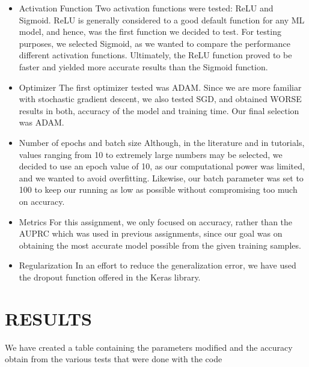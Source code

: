 \documentclass{article}
\begin{document}
\begin{itemize}

  \item{Activation Function} Two activation functions were tested: ReLU and Sigmoid. ReLU is generally considered to a good default function for any ML model, and hence, was the first function we decided to test. For testing purposes, we selected Sigmoid, as we wanted to compare the performance   different activation functions. Ultimately, the ReLU function proved to be faster and yielded more accurate results than the Sigmoid function.
  
   \item{  Optimizer}
   The first optimizer tested was ADAM. Since we are more familiar with stochastic gradient descent, we also tested SGD, and obtained  WORSE results in both, accuracy of the model and training time. Our final selection was ADAM.
   
     \item{ Number of epochs and batch size}
     Although, in the literature and in tutorials, values ranging from 10 to extremely large numbers may be selected,  we decided to use an epoch value of 10, as our computational power was limited, and we wanted to avoid overfitting. Likewise, our batch parameter was set to 100 to keep our running as low as possible without compromising too much on accuracy.
     
      \item{Metrics}
   For this assignment, we only focused on accuracy, rather than the AUPRC which was used in previous assignments, since our goal was on obtaining the most accurate model possible from the given training samples. 
    \item{ Regularization}
    In an effort to reduce the generalization error, we have used the dropout function offered in the Keras library. 
\end{itemize}
\section{RESULTS}
    We have created a table containing the parameters modified and the accuracy obtain from the various tests that were done with the code
\end{document}

